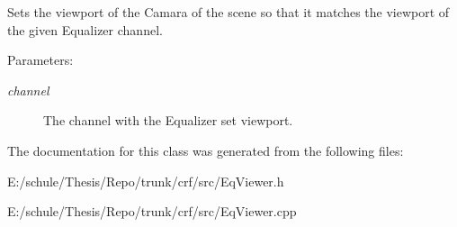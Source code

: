 Sets the viewport of the Camara of the scene so that it matches the viewport of the given Equalizer channel. 

\begin{Desc}
\item[Parameters:]
\begin{description}
\item[{\em channel}]The channel with the Equalizer set viewport. \end{description}
\end{Desc}


The documentation for this class was generated from the following files:\begin{CompactItemize}
\item 
E:/schule/Thesis/Repo/trunk/crf/src/EqViewer.h\item 
E:/schule/Thesis/Repo/trunk/crf/src/EqViewer.cpp\end{CompactItemize}

